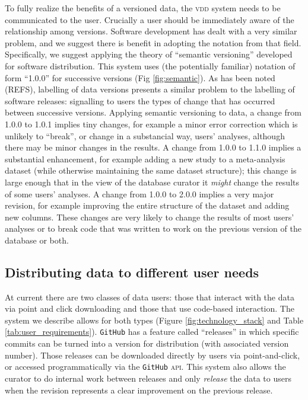 \documentclass[a4paper,11pt]{article}
\begin{document}
To fully realize the benefits of a versioned data, the \textsc{vdd} system needs to be communicated to the user.  Crucially a user should be immediately aware of the relationship among versions.  Software development has dealt with a very similar problem, and we suggest there is benefit in adopting the notation from that field.  Specifically, we suggest applying the theory of ``semantic versioning'' developed for software distribution. This system uses (the potentially familiar) notation of form ``1.0.0'' for successive versions (Fig \ref{fig:semantic}). As has been noted (REFS), labelling of data versions presents a similar problem to the labelling of software releases: signalling to users the types of change that has occurred between successive versions. Applying semantic versioning to data, a change from 1.0.0 to 1.0.1 implies tiny changes, for example a minor error correction which is unlikely to ``break'', or change in a substancial way, users' analyses, although there may be minor changes in the results. A change from 1.0.0 to 1.1.0 implies a substantial enhancement, for example adding a new study to a meta-analysis dataset (while otherwise maintaining the same dataset structure); this change is large enough that in the view of the database curator it \emph{might} change the results of some users' analyses. A change from 1.0.0 to 2.0.0 implies a very major revision, for example improving the entire structure of the dataset and adding new columns. These changes are very likely to change the results of most users' analyses or to break code that was written to work on the previous version of the database or both.  


\subsection{Distributing data to different user needs}

At current there are two classes of data users: those that  interact with the data via point and click downloading and those that use code-based interaction.  The system we describe allows for both types (Figure \ref{fig:technology_stack} and Table \ref{tab:user_requirements}).  \texttt{GitHub} has a feature called ``releases'' in which specific commits can be turned into a version for distribution (with associated version number).  Those releases can be downloaded directly by users via point-and-click, or accessed programmatically via the \texttt{GitHub} \textsc{api}.  This system also allows the curator to do internal work between releases and only \emph{release} the data to users when the revision represents a clear improvement on the previous release.  
\end{document}
